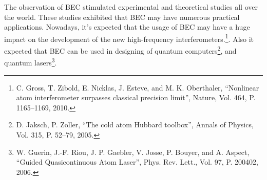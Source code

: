 \documentclass[candidate, href, colorlinks]{disser}
\begin{document}
The observation of BEC stimulated experimental and theoretical studies all over the world.
These studies exhibited that BEC may have numerous practical applications.
Nowadays, it's expected that the usage of BEC may have a huge impact on the development of the new high-frequency interferometers.\footnote{C. Gross, T. Zibold, E. Nicklas, J. Esteve, and M. K. Oberthaler, ``Nonlinear atom interferometer surpasses classical precision limit'', Nature, Vol. 464, P. 1165--1169, 2010.}.
Also it expected that BEC can be used in designing of quantum computers\footnote{D. Jaksch, P. Zoller, ``The cold atom Hubbard toolbox'', Annals of Physics, Vol. 315, P. 52--79, 2005.}, and quantum lasers\footnote{W. Guerin, J.-F. Riou, J. P. Gaebler, V. Josse, P. Bouyer, and A. Aspect, ``Guided Quasicontinuous Atom Laser'', Phys. Rev. Lett., Vol. 97, P. 200402, 2006.}.
\end{document}
